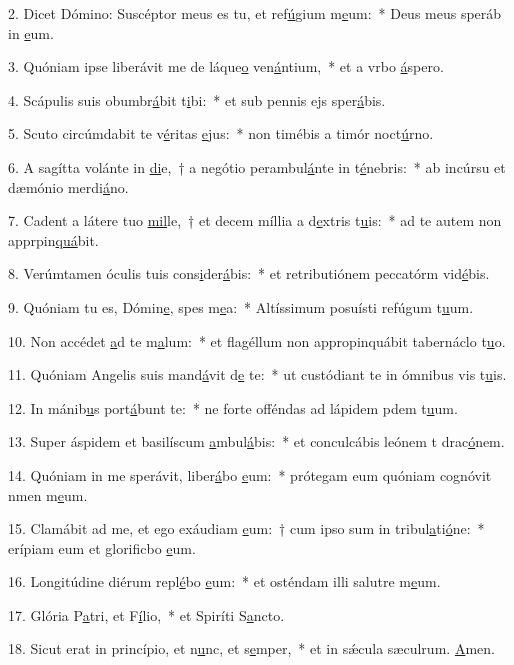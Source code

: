 2. Dicet Dómino: Suscéptor meus es tu, et ref\uline{ú}gium m\uline{e}um:~* Deus meus speráb in \uline{e}um.\par 
3. Quóniam ipse liberávit me de láque\uline{o} ven\uline{á}ntium,~* et a vrbo \uline{á}spero.\par 
4. Scápulis suis obumbr\uline{á}bit t\uline{i}bi:~* et sub pennis ejs sper\uline{á}bis.\par 
5. Scuto circúmdabit te v\uline{é}ritas \uline{e}jus:~* non timébis a timór noct\uline{ú}rno.\par 
6. A sagítta volánte in \uline{di}e,~† a negótio perambul\uline{á}nte in t\uline{é}nebris:~* ab incúrsu et dæmónio merdi\uline{á}no.\par 
7. Cadent a látere tuo \uline{mil}le,~† et decem míllia a d\uline{e}xtris t\uline{u}is:~* ad te autem non apprpin\uline{quá}bit.\par 
8. Verúmtamen óculis tuis cons\uline{i}der\uline{á}bis:~* et retributiónem peccatórm vid\uline{é}bis.\par 
9. Quóniam tu es, Dómin\uline{e}, spes m\uline{e}a:~* Altíssimum posuísti refúgum t\uline{u}um.\par 
10. Non accédet \uline{a}d te m\uline{a}lum:~* et flagéllum non appropinquábit tabernáclo t\uline{u}o.\par 
11. Quóniam Angelis suis mand\uline{á}vit d\uline{e} te:~* ut custódiant te in ómnibus vis t\uline{u}is.\par 
12. In mánib\uline{u}s port\uline{á}bunt te:~* ne forte offéndas ad lápidem pdem t\uline{u}um.\par 
13. Super áspidem et basilíscum \uline{a}mbul\uline{á}bis:~* et conculcábis leónem t drac\uline{ó}nem.\par 
14. Quóniam in me sperávit, liber\uline{á}bo \uline{e}um:~* prótegam eum quóniam cognóvit nmen m\uline{e}um.\par 
15. Clamábit ad me, et ego exáudiam \uline{e}um:~† cum ipso sum in tribul\uline{a}ti\uline{ó}ne:~* erípiam eum et glorificbo \uline{e}um.\par 
16. Longitúdine diérum repl\uline{é}bo \uline{e}um:~* et osténdam illi salutre m\uline{e}um.\par 
17. Glória P\uline{a}tri, et F\uline{í}lio,~* et Spiríti S\uline{a}ncto.\par 
18. Sicut erat in princípio, et n\uline{u}nc, et s\uline{e}mper,~* et in sǽcula sæculrum. \uline{A}men.\par 
